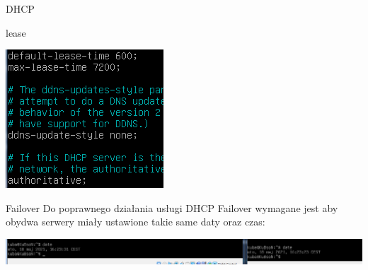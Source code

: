 \documentclass[presentation]{beamer}
\begin{document}
\begin{frame}[label={sec:org5c39ba0}]{DHCP}
\begin{block}{lease}
\begin{center}
\includegraphics[width=.9\linewidth]{./data/dhcp/5_small.png}
\end{center}
\end{block}
\end{frame}
\begin{frame}[label={sec:org0deb090}]{Failover}
Do poprawnego działania usługi DHCP Failover wymagane jest aby obydwa serwery miały ustawione takie same daty oraz czas:
\begin{center}
\includegraphics[width=.9\linewidth]{./data/dhcp/6_czas.png}
\end{center}
\end{frame}
\end{document}
